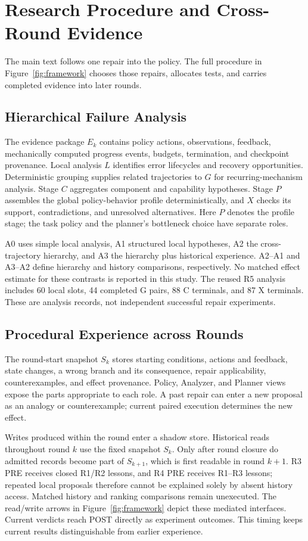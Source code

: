 \section{Research Procedure and Cross-Round Evidence}
\label{app:research}
The main text follows one repair into the policy. The full procedure in
Figure~\ref{fig:framework} chooses those repairs, allocates tests, and
carries completed evidence into later rounds.

\subsection{Hierarchical Failure Analysis}
\label{sec:analysis-memory}
The evidence package $E_k$ contains policy actions, observations, feedback,
mechanically computed progress events, budgets, termination, and checkpoint
provenance. Local analysis $L$ identifies error lifecycles and recovery
opportunities. Deterministic grouping supplies related trajectories to $G$
for recurring-mechanism analysis. Stage $C$ aggregates component and
capability hypotheses. Stage $P$ assembles the global policy-behavior profile
deterministically, and $X$ checks its support, contradictions, and unresolved
alternatives. Here $P$ denotes the profile stage; the task policy and the
planner's bottleneck choice have separate roles.

A0 uses simple local analysis, A1 structured local hypotheses, A2 the
cross-trajectory hierarchy, and A3 the hierarchy plus historical experience.
A2--A1 and A3--A2 define hierarchy and history comparisons, respectively.
No matched effect estimate for these contrasts is reported in this study.
The reused R5 analysis includes 60 local slots, 44 completed G pairs,
88 C terminals, and 87 X terminals. These are analysis records, not
independent successful repair experiments.

\subsection{Procedural Experience across Rounds}
The round-start snapshot $S_k$ stores starting conditions, actions and
feedback, state changes, a wrong branch and its consequence, repair
applicability, counterexamples, and effect provenance. Policy, Analyzer, and
Planner views expose the parts appropriate to each role. A past repair
can enter a new proposal as an analogy or counterexample; current paired
execution determines the new effect.

Writes produced within the round enter a shadow store. Historical reads
throughout round $k$ use the fixed snapshot $S_k$. Only after round closure
do admitted records become part of $S_{k+1}$, which is first readable in
round $k+1$. R3 PRE receives closed R1/R2 lessons, and R4 PRE receives R1--R3 lessons;
repeated local proposals therefore cannot be explained solely by absent
history access. Matched history and ranking comparisons remain unexecuted.
The read/write arrows in Figure~\ref{fig:framework} depict these
mediated interfaces. Current verdicts reach POST directly as experiment
outcomes. This timing keeps current results distinguishable from earlier
experience.


